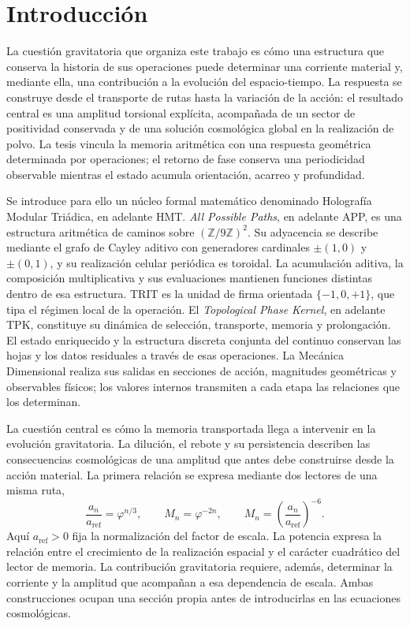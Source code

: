 \section{Introducción}
\label{vii:sec:introduccion}

La cuestión gravitatoria que organiza este trabajo es cómo una estructura
que conserva la historia de sus operaciones puede determinar una
corriente material y, mediante ella, una contribución a la evolución del
espacio-tiempo. La respuesta se construye desde el transporte de rutas
hasta la variación de la acción: el resultado central es una amplitud
torsional explícita, acompañada de un sector de positividad conservada y
de una solución cosmológica global en la realización de polvo. La tesis
vincula la memoria aritmética con una respuesta geométrica determinada por
operaciones; el retorno de fase conserva una periodicidad observable
mientras el estado acumula orientación, acarreo y profundidad.

Se introduce para ello un núcleo formal matemático denominado Holografía
Modular Triádica, en adelante HMT. \emph{All Possible Paths}, en adelante
APP, es una estructura aritmética de caminos sobre
\((\mathbb Z/9\mathbb Z)^2\). Su adyacencia se describe mediante el grafo
de Cayley aditivo con generadores cardinales \(\pm(1,0)\) y
\(\pm(0,1)\), y su realización celular periódica es toroidal. La acumulación
aditiva, la composición multiplicativa y sus evaluaciones mantienen
funciones distintas dentro de esa estructura. TRIT es la unidad de firma
orientada \(\{-1,0,+1\}\), que tipa el régimen local de la operación.
El \emph{Topological Phase Kernel}, en adelante TPK, constituye su
dinámica de selección, transporte, memoria y prolongación. El estado
enriquecido y la estructura discreta conjunta del continuo conservan las
hojas y los datos residuales a través de esas operaciones. La Mecánica
Dimensional realiza sus salidas en secciones de acción, magnitudes
geométricas y observables físicos; los valores internos transmiten a
cada etapa las relaciones que los determinan.

La cuestión central es cómo la memoria transportada llega a intervenir
en la evolución gravitatoria. La dilución, el rebote y su persistencia
describen las consecuencias cosmológicas de una amplitud que antes debe
construirse desde la acción material. La primera relación se expresa
mediante dos lectores de una misma ruta,
\begin{equation}
 \frac{a_n}{a_{\mathrm{ref}}}=\varphi^{n/3},
 \qquad M_n=\varphi^{-2n},
 \qquad
 M_n=\left(\frac{a_n}{a_{\mathrm{ref}}}\right)^{-6}.
 \label{vii:eq:programa-dilucion}
\end{equation}
Aquí \(a_{\mathrm{ref}}>0\) fija la normalización del factor de escala.
La potencia expresa la relación entre el crecimiento de la realización
espacial y el carácter cuadrático del lector de memoria. La contribución
gravitatoria requiere, además, determinar la corriente y la amplitud que
acompañan a esa dependencia de escala. Ambas construcciones ocupan una
sección propia antes de introducirlas en las ecuaciones cosmológicas.


